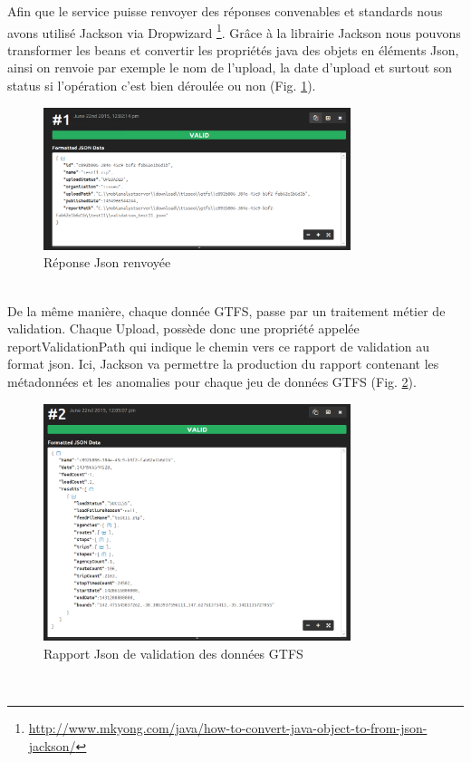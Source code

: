 \begin{itemize}
Afin que le service puisse renvoyer des réponses convenables et standards nous avons utilisé Jackson via Dropwizard \footnote{\url{http://www.mkyong.com/java/how-to-convert-java-object-to-from-json-jackson/}}. Grâce à la librairie Jackson nous pouvons transformer les \og beans \fg et convertir les propriétés java des objets en éléments Json, ainsi on renvoie par exemple le nom de l'upload, la date d'upload et surtout son status si l'opération c'est bien déroulée ou non (Fig. \ref{fig:Json1}).
\\
\begin{figure}[h]
	\centering
		\includegraphics[width=0.8\textwidth]{images/JsonFormatter_serialization.PNG}
	\caption{Réponse Json renvoyée}
	\label{fig:Json1}
\end{figure}\\

De la même manière, chaque donnée GTFS, passe par un traitement métier de validation. Chaque Upload, possède donc une propriété appelée \og reportValidationPath \fg qui indique le chemin vers ce rapport de validation au format json. Ici, Jackson va permettre la production du rapport contenant les métadonnées et les anomalies pour chaque jeu de données GTFS (Fig. \ref{fig:Json2}).
\\
\begin{figure}[h]
	\centering
		\includegraphics[width=0.8\textwidth]{images/JsonFormatter_serialization_Validation.PNG}
	\caption{Rapport Json de validation des données GTFS}
	\label{fig:Json2}
\end{figure}\\



\end{itemize}
